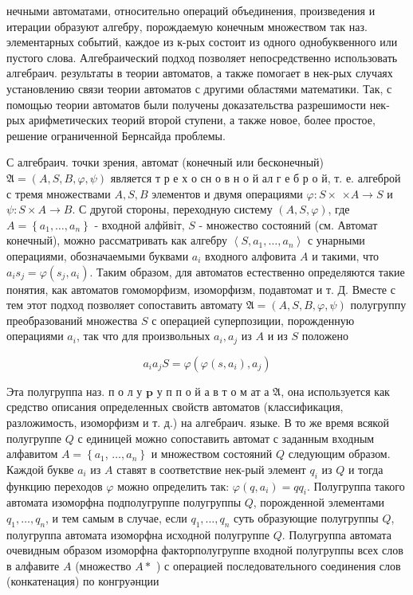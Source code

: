 \documentclass[10pt]{article}
\begin{document}
нечными автоматами, относительно операций объединения, произведения и итерации образуют алгебру, порождаемую конечным множеством так наз. элементарных событий, каждое из к-рых состоит из одного однобуквенного или пустого слова. Алгебраический подход позволяет непосредственно использовать алгебраич. результаты в теории автоматов, а также помогает в нек-рых случаях установлению связи теории автоматов с другими областями математики. Так, с помощью теории автоматов были получены доказательства разрешимости нек-рых арифметических теорий второй ступени, а также новое, более простое, решение ограниченной Бернсайда проблемы.



С алгебраич. точки зрения, автомат (конечный или бесконечный) $\mathfrak{A}=(A, S, B, \varphi, \psi)$ является т р е х о сн о в н о й ал г е б р о й, т. е. алгеброй с тремя множествами $A, S, B$ элементов и двумя операциями $\varphi: S \times$ $\times A \rightarrow S$ и $\psi: S \times A \rightarrow B$. С другой стороны, переходную систему $(A, S, \varphi)$, где $A=\left\{a_{1}, \ldots, a_{n}\right\}$ - входной алфйвіт, $S$ - множество состояний (см. Автомат конечный), можно рассматривать как алгебру $\left\langle S, a_{1}, \ldots, a_{n}\right\rangle$ с унарными операциями, обозначаемыми буквами $a_{i}$ входного алфовита $A$ и такими, что $a_{i} s_{j}=\varphi\left(s_{j}, a_{i}\right)$. Таким образом, для автоматов естественно определяются такие понятия, как автоматов гомоморфизм, изоморфизм, подавтомат и т. Д. Вместе с тем этот подход позволяет сопоставить автомату $\mathfrak{A}=(A, S, B, \varphi, \psi)$ полугруппу преобразований множества $S$ с операцией суперпозиции, порожденную операциями $a_{i}$, так что для произвольных $a_{i}, a_{j}$ из $A$ и из $S$ положено



\[

a_{i} a_{j} S=\varphi\left(\varphi\left(s, a_{i}\right), a_{j}\right)

\]



Эта полугруппа наз. п о л у $\mathbf{p}$ у п п о й а в т о м ат а $\mathfrak{A}$, она используется как средство описания определенных свойств автоматов (классификация, разложимость, изоморфизм и т. д.) на алгебраич. языке. В то же время всякой полугруппе $Q$ с единицей можно сопоставить автомат с заданным входным алфавитом $A=\left\{a_{1}\right.$, $\left.\ldots, a_{n}\right\}$ и множеством состояний $Q$ следующим образом. Каждой букве $a_{i}$ из $A$ ставят в соответствие нек-рый элемент $q_{i}$ из $Q$ и тогда функцию переходов $\varphi$ можно определить так: $\varphi\left(q, a_{i}\right)=q q_{i}$. Полугруппа такого автомата изоморфна подполугруппе полугруппы $Q$, порожденной элементами $q_{1}, \ldots, q_{n}$, и тем самым в случае, если $q_{1}, \ldots, q_{n}$ суть образующие полугруппы $Q$, полугруппа автомата изоморфна исходной полугруппе $Q$. Полугруппа автомата очевидным образом изоморфна факторполугруппе входной полугруппы всех слов в алфавите $A$ (множество $A *$ ) с операцией последовательного соединения слов (конкатенация) по конгруәнции
\end{document}
